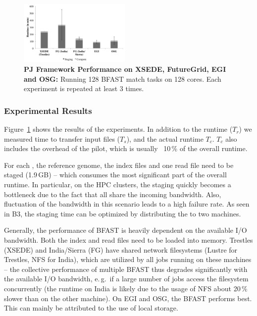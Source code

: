 \documentclass[conference]{IEEEtran}
\begin{document}
\begin{figure}[t]
 \centering
 \includegraphics[width=0.48\textwidth]{../perf/interop/128-bfast-egi-fg-xsede-osg-with-staging.pdf}
 \caption{\textbf{PJ Framework Performance on XSEDE, FutureGrid, EGI and 
  OSG:} Running 128 BFAST match tasks on 128 cores. Each experiment is
  repeated at least 3 times. }
\label{fig:perf_perf-bfast-bj}
\end{figure}


\subsubsection*{Experimental Results}

Figure~\ref{fig:perf_perf-bfast-bj} shows the results of the experiments. In
addition to the runtime ($T_r$) we measured %
time to transfer input files ($T_s$), and the actual runtime $T_c$. $T_c$ also
includes the overhead of the pilot, which is usually ~10\,\% of the overall
runtime.

For each \cu, the reference genome, the index files and one read file need to
be staged (1.9\,GB) -- which consumes the most significant part of the overall
runtime. In particular, on the HPC clusters, the staging quickly becomes a
bottleneck due to the fact that all \cus share the incoming bandwidth. Also,
fluctuation of the bandwidth in this scenario leads to a high failure rate. As
seen in B3, the staging time can be optimized by distributing the \cus to two
machines.


Generally, the performance of BFAST is heavily dependent on the available I/O
bandwidth. Both the index and read files need to be loaded into memory.
Trestles (XSEDE) and India/Sierra (FG) have shared network filesystems (Lustre
for Trestles, NFS for India), which are utilized by all jobs running on these
machines -- the collective performance of multiple BFAST \cu thus degrades
significantly with the available I/O bandwidth, e.\,g.\ if a large number of
jobs access the filesystem concurrently (the runtime on India is likely due to
the usage of NFS about 20\,\% slower than on the other machine). On EGI and
OSG, the BFAST \cu performs best. This can mainly be attributed to the use of
local storage.
\end{document}
